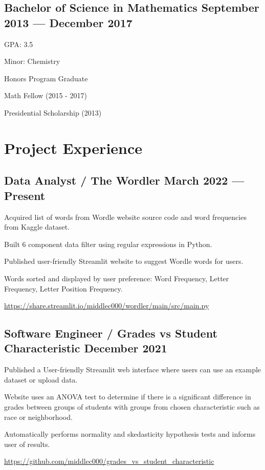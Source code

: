 \documentclass[letter,10pt]{article}
\begin{document}
\subsection{{Bachelor of Science in Mathematics \hfill September 2013 --- December 2017}}
\begin{zitemize}
    \item GPA: 3.5
    \item Minor: Chemistry
    \item Honors Program Graduate
    \item Math Fellow (2015 - 2017)
    \item Presidential Scholarship (2013)
\end{zitemize}

\section{Project Experience}
\subsection{{Data Analyst / The Wordler \hfill March 2022 --- Present}}
\begin{zitemize}
    \item Acquired list of words from Wordle website source code and word frequencies from Kaggle dataset.
    \item Built 6 component data filter using regular expressions in Python.
    \item Published user-friendly Streamlit website to suggest Wordle words for users.
    \item Words sorted and displayed by user preference: Word Frequency, Letter Frequency, Letter Position Frequency.
    \item \url{https://share.streamlit.io/middlec000/wordler/main/src/main.py}
\end{zitemize}

\subsection{{Software Engineer / Grades vs Student Characteristic \hfill December 2021}}
\begin{zitemize}
    \item Published a User-friendly Streamlit web interface where users can use an example dataset or upload data.
    \item Website uses an ANOVA test to determine if there is a significant difference in grades between groups of students with groups from chosen characteristic such as race or neighborhood.
    \item Automatically performs normality and skedasticity hypothesis tests and informs user of results.
    \item \url{https://github.com/middlec000/grades_vs_student_characteristic}
\end{zitemize}
\end{document}
